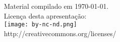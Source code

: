 \documentclass[portuguese,10pt,xcolor=table]{beamer}
\title{\insertlecture}
\author{Rafael Beserra Gomes}
\institute{UFRN}
\subtitle{Subtítulo}
\date{}
\begin{document}

\begin{frame}
	\maketitle
	\begin{center}
		\tiny
		Material compilado em \today.\\
		Licença desta apresentação:\\
		\texttt{[image: by-nc-nd.png]}\\
		http://creativecommons.org/licenses/
	\end{center}
\end{frame}
\end{document}
